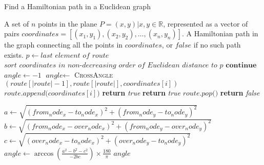 \documentclass[a4paper,10pt,ngerman]{scrartcl}
\begin{document}
\begin{algorithm}
    \caption{Find a Hamiltonian path in a Euclidean graph}
    \begin{algorithmic}
        \Require A set of $n$ points in the plane $P={(x,y)| x,y \in \mathbb{R}}$, represented as a vector of pairs $\textit{coordinates}=[(x_1,y_1), (x_2,y_2),\dots, (x_n,y_n)]$.
        \Ensure A Hamiltonian path in the graph connecting all the points in $\textit{coordinates}$, or $\textit{false}$ if no such path exists.
                \State $p\gets \textit{last element of } \textit{route}$
                \State $\textit{sort } \textit{coordinates } \textit{in non-decreasing order of Euclidean distance to } p$
            \EndIf
                    \State $\textbf{continue}$
                \EndIf
                \State $\textit{angle}\gets -1$
                    \State $\textit{angle}\gets$ \textsc{CrossAngle}$(\textit{route}[|\textit{route}|-1], \textit{route}[|\textit{route}|], \textit{coordinates}[i])$
                \EndIf
                    \State $\textit{route.append(}\textit{coordinates}[i]\textit{)}$
                        \State \textbf{return} \textit{true}
                    \EndIf
                        \State \textbf{return} \textit{true}
                    \Else
                        \State $\textit{route.pop()}$
                    \EndIf
                \EndIf
            \EndFor
            \State \textbf{return} \textit{false}
        \EndFunction
    \end{algorithmic}
            \begin{algorithmic}
 \State $\textit{a}\gets \sqrt{(from_node_x - to_node_x)^2 + (from_node_y - to_node_y)^2}$
            \State $\textit{b}\gets \sqrt{(from_node_x - over_node_x)^2 + (from_node_y - over_node_y)^2}$
            \State $\textit{c}\gets \sqrt{(over_node_x - to_node_x)^2 + (over_node_y - to_node_y)^2}$
            \State $\textit{angle} \gets \arccos\left(\frac{a^2 - b^2 - c^2}{-2bc}\right) \times \frac{180}{\pi}$
            \State \Return $angle$
            \EndFunction
\end{algorithmic}\label{alg:algorithm2}
\end{algorithm}
\end{document}
